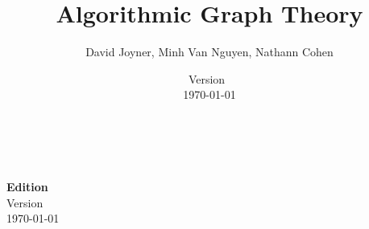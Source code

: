 \documentclass[a4paper,twoside,12pt]{book}
\begin{document}

\title{\Huge\bf Algorithmic Graph Theory}
\author{\Large David Joyner, Minh Van Nguyen, Nathann Cohen}
\date{%
  Version~\documentEdition \\
  \today
}
\maketitle

{\thispagestyle{empty}
   \\\\
  \textbf{Edition} \\
  Version~\documentEdition \\
  \today
}

\frontmatter
\setcounter{tocdepth}{1}
\tableofcontents
\let\cleardoublepage\clearpage

\let\cleardoublepage\clearpage

\mainmatter












\appendix
\cleardoublepage

\cleardoublepage


\backmatter
\cleardoublepage
{}


\cleardoublepage
{}
\printindex
\end{document}
